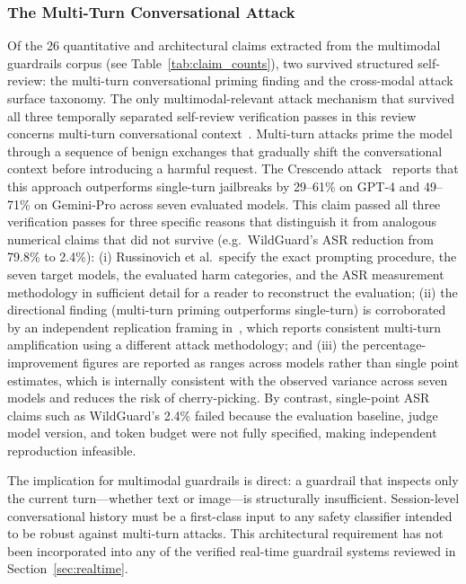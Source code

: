 \subsubsection{The Multi-Turn Conversational Attack}

Of the 26 quantitative and architectural claims extracted from the multimodal
guardrails corpus (see Table~\ref{tab:claim_counts}), two survived structured
self-review: the multi-turn conversational priming finding and the cross-modal
attack surface taxonomy.
The only multimodal-relevant attack mechanism that survived all three temporally
separated self-review verification passes in this review concerns multi-turn
conversational context~\cite{li2024llm,russinovich2024greatescalation}.
Multi-turn attacks prime the model through a sequence of benign exchanges that
gradually shift the conversational context before introducing a harmful request.
The Crescendo attack~\cite{russinovich2024greatescalation} reports that this
approach outperforms single-turn jailbreaks by 29--61\% on GPT-4 and 49--71\% on
Gemini-Pro across seven evaluated models.
This claim passed all three verification passes for three specific reasons that
distinguish it from analogous numerical claims that did not survive (e.g.\
WildGuard's ASR reduction from 79.8\% to 2.4\%): (i) Russinovich et al.\ specify
the exact prompting procedure, the seven target models, the evaluated harm
categories, and the ASR measurement methodology in sufficient detail for a reader
to reconstruct the evaluation; (ii) the directional finding (multi-turn priming
outperforms single-turn) is corroborated by an independent replication framing
in~\cite{li2024llm}, which reports consistent multi-turn amplification using a
different attack methodology; and (iii) the percentage-improvement figures are
reported as ranges across models rather than single point estimates, which is
internally consistent with the observed variance across seven models and reduces
the risk of cherry-picking.
By contrast, single-point ASR claims such as WildGuard's 2.4\% failed because the
evaluation baseline, judge model version, and token budget were not fully specified,
making independent reproduction infeasible.

The implication for multimodal guardrails is direct: a guardrail that inspects only
the current turn---whether text or image---is structurally insufficient.
Session-level conversational history must be a first-class input to any safety
classifier intended to be robust against multi-turn attacks.
This architectural requirement has not been incorporated into any of the verified
real-time guardrail systems reviewed in Section~\ref{sec:realtime}.

